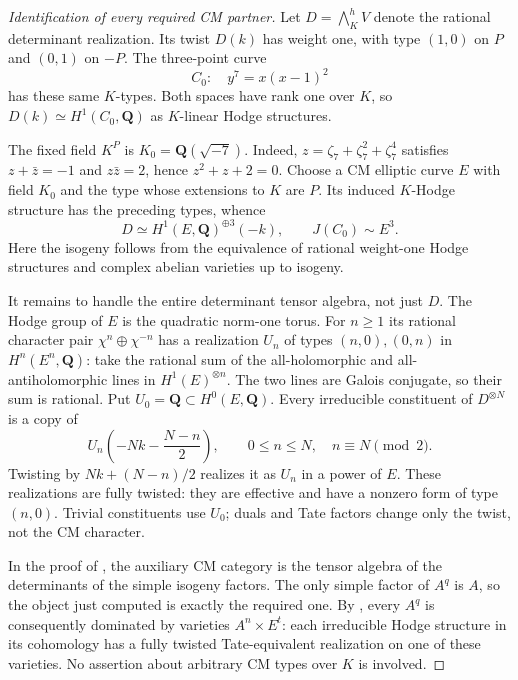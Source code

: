 \documentclass[11pt]{article}
\theoremstyle{definition}
\newcommand{\Q}{\mathbf Q}
\begin{document}
\begin{proof}[Identification of every required CM partner]
Let $D=\bigwedge_K^h V$ denote the rational determinant realization.
Its twist $D(k)$ has weight one, with type $(1,0)$ on $P$ and $(0,1)$
on $-P$. The three-point curve
\[
                          C_0:\quad y^7=x(x-1)^2
\]
has these same $K$-types. Both spaces have rank one over $K$, so
$D(k)\simeq H^1(C_0,\Q)$ as $K$-linear Hodge structures.

The fixed field $K^P$ is $K_0=\Q(\sqrt{-7})$. Indeed,
$z=\zeta_7+\zeta_7^2+\zeta_7^4$ satisfies
$z+\bar z=-1$ and $z\bar z=2$, hence $z^2+z+2=0$.
Choose a CM elliptic curve $E$ with field $K_0$ and the type whose
extensions to $K$ are $P$. Its induced $K$-Hodge structure has the
preceding types, whence
\[
 D\simeq H^1(E,\Q)^{\oplus3}(-k),
 \qquad J(C_0)\sim E^3.
\]
Here the isogeny follows from the equivalence of rational weight-one
Hodge structures and complex abelian varieties up to isogeny.

It remains to handle the entire determinant tensor algebra, not just
$D$. The Hodge group of $E$ is the quadratic norm-one torus. For
$n\geq1$ its rational character pair $\chi^n\oplus\chi^{-n}$ has
a realization $U_n$ of types $(n,0),(0,n)$ in $H^n(E^n,\Q)$: take
the rational sum of the all-holomorphic and all-antiholomorphic lines
in $H^1(E)^{\otimes n}$. The two lines are Galois conjugate, so their
sum is rational. Put $U_0=\Q\subset H^0(E,\Q)$.
Every irreducible constituent of $D^{\otimes N}$ is a copy of
\[
 U_n\left(-Nk-\frac{N-n}{2}\right),
 \qquad 0\leq n\leq N,\quad n\equiv N\pmod2.
\]
Twisting by $Nk+(N-n)/2$ realizes it as $U_n$ in a power of $E$.
These realizations are fully twisted: they are effective and have a
nonzero form of type $(n,0)$. Trivial constituents use $U_0$; duals
and Tate factors change only the twist, not the CM character.

In the proof of \cite[Theorem 11]{Abdulali12}, the auxiliary CM
category is the tensor algebra of the determinants of the simple
isogeny factors. The only simple factor of $A^q$ is $A$, so the
object just computed is exactly the required one. By
\cite[Remark 12]{Abdulali12}, every $A^q$ is consequently dominated
by varieties $A^n\times E^t$: each irreducible Hodge structure in
its cohomology has a fully twisted Tate-equivalent realization on
one of these varieties. No assertion about arbitrary CM types over
$K$ is involved.
\end{proof}
\end{document}
